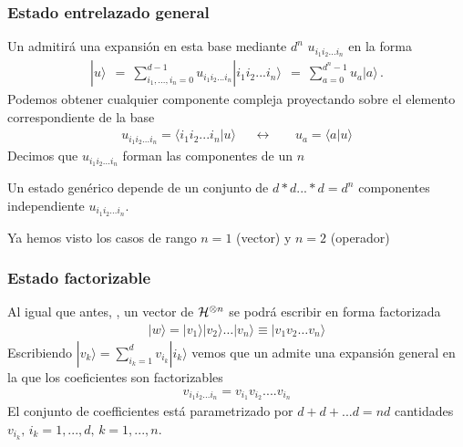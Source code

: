 \documentclass[letterpaper,10pt,english]{jupyterBook}
\newcommand{\ket}[1]{|#1\rangle}
\newcommand{\braket}[2]{\langle #1|#2\rangle}
\newcommand{\Hil}{{\cal H}}
\begin{document}
\subsubsection{Estado entrelazado general}
\label{\detokenize{docs/Part_01_Formalismo/Chapter_01_02_Formalismo_matem_xe1tico/01_04_Tensores_myst:estado-entrelazado-general}}
\sphinxAtStartPar
Un  admitirá una expansión en esta base mediante \(d^n\) 
\(u_{i_1 i_2...i_n}\) en la forma
\begin{equation*}
\begin{split}
\ket{u} ~~=~ \sum_{i_1,...,i_n=0}^{d-1} u_{i_1i_2...i_n} \ket{i_1i_2...i_n} ~~=~
 \sum_{a=0}^{d^n-1} u_a\ket{a}\, .
\end{split}
\end{equation*}
\sphinxAtStartPar
Podemos obtener cualquier componente compleja proyectando sobre el elemento correspondiente de la base
\begin{equation*}
\begin{split}
u_{i_1i_2...i_n} = \braket{i_1 i_2... i_n}{u}~~~~~~\leftrightarrow~~~~~~~~u_a = \braket{a}{u}
\end{split}
\end{equation*}
\sphinxAtStartPar
Decimos que \(u_{i_1i_2...i_n}\) forman las componentes de un  \(n\)

\sphinxAtStartPar
Un estado genérico depende de un conjunto de \(d*d...*d = d^n\) componentes independiente \(u_{i_1i_2...i_n}\).

\sphinxAtStartPar
Ya hemos visto los casos de rango \(n=1\) (vector) y \(n=2\) (operador)


\subsubsection{Estado factorizable}
\label{\detokenize{docs/Part_01_Formalismo/Chapter_01_02_Formalismo_matem_xe1tico/01_04_Tensores_myst:estado-factorizable}}
\sphinxAtStartPar
Al igual que antes, , un vector de \(\Hil^{\otimes n}\) se podrá escribir en forma factorizada
\begin{equation*}
\begin{split}
\ket{w} = \ket{v_1}\ket{v_2}\ldots\ket{v_n} \equiv \ket{v_1 v_2 \ldots v_n}
\end{split}
\end{equation*}
\sphinxAtStartPar
Escribiendo \(\ket{v_k} = \sum_{i_k=1}^d v_{i_k}\ket{i_k}\) vemos que un  admite una expansión general en la que los coeficientes son factorizables
\begin{equation*}
\begin{split}
v_{i_1i_2...i_n}  = v_{i_1} v_{i_2}.... v_{i_n}
\end{split}
\end{equation*}
\sphinxAtStartPar
El conjunto de coefficientes
está parametrizado por \(d +d + ...d = nd\) cantidades \(v_{i_k}, \, i_k=1,...,d, \, k=1,...,n\).
\end{document}
